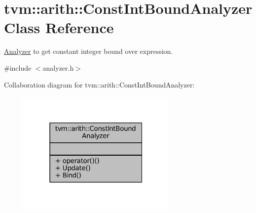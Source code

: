 \hypertarget{classtvm_1_1arith_1_1ConstIntBoundAnalyzer}{}\section{tvm\+:\+:arith\+:\+:Const\+Int\+Bound\+Analyzer Class Reference}
\label{classtvm_1_1arith_1_1ConstIntBoundAnalyzer}


\hyperlink{classtvm_1_1arith_1_1Analyzer}{Analyzer} to get constant integer bound over expression.  




{\ttfamily \#include $<$analyzer.\+h$>$}



Collaboration diagram for tvm\+:\+:arith\+:\+:Const\+Int\+Bound\+Analyzer\+:
\nopagebreak
\begin{figure}[H]
\begin{center}
\leavevmode
\includegraphics[width=220pt]{classtvm_1_1arith_1_1ConstIntBoundAnalyzer__coll__graph}
\end{center}
\end{figure}
